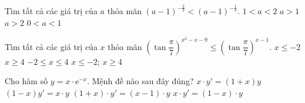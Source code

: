 \begin{ex}%
	Tìm tất cả các giá trị của $a$ thỏa mãn $(a-1)^{-\frac{2}{3}}<(a-1)^{-\frac{1}{3}}$.
	\choice
	{$1<a<2$}
	{$a>1$}
	{\True $a>2$}
	{$0<a<1$}
\end{ex}

\begin{ex}%
	Tìm tất cả các giá trị của $x$ thỏa mãn $\left(\tan \dfrac{\pi}{7}\right)^{x^2-x-9} \leq \left(\tan \dfrac{\pi}{7}\right)^{x-1}$.
	\choice
	{$x \leq -2$}
	{$x\geq 4$}
	{$-2\leq x\leq 4$}
	{\True $x\leq -2$; $x \geq 4$}
\end{ex}

\begin{ex}%
	Cho hàm số $y=x\cdot \mathrm{e}^{-x}$. Mệnh đề nào sau đây đúng?
	\choice
	{$x\cdot y'= (1+x)y$}
	{$(1-x)y'=x\cdot y$}
	{$(1+x)\cdot y'=(x-1)\cdot y$}
	{\True $x\cdot y'=(1-x)\cdot y$}
\end{ex}


